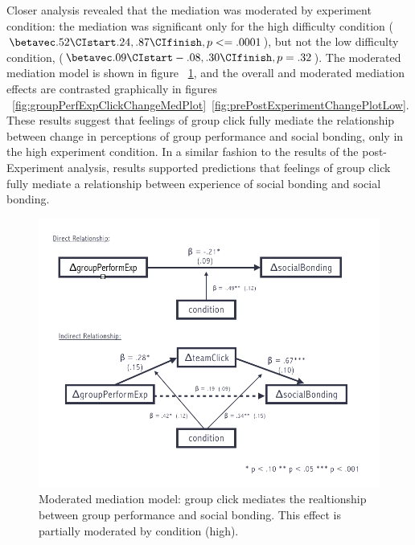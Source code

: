 Closer analysis revealed that the mediation was moderated by experiment condition: the mediation was significant only for the high difficulty condition ($\betavec .52  \CIstart .24, .87 \CIfinish, p <=.0001$), but not the low difficulty condition, ($\betavec .09  \CIstart -.08, .30 \CIfinish, p =.32$). The moderated mediation model is shown in figure ~\ref{fig:prePostExperimentChangeModMedFigure}, and the overall and moderated mediation effects are contrasted graphically in figures ~\ref{fig:groupPerfExpClickChangeMedPlot}\nobreakdash~\ref{fig:prePostExperimentChangePlotLow}.  These results suggest that feelings of group click fully mediate the relationship between change in perceptions of group performance and social bonding, only in the high experiment condition.  In a similar fashion to the results of the post-Experiment analysis, results supported predictions that feelings of group click fully mediate a relationship between experience of social bonding and social bonding.

\begin{figure}
  \centering
  \includegraphics[width=0.9\linewidth,keepaspectratio] {images/prePostExperimentChangeModMedFigure}
  \caption{Moderated mediation model: group click mediates the realtionship between group performance and social bonding.  This effect is partially moderated by condition (high).}
  \label{fig:prePostExperimentChangeModMedFigure}
\end{figure}

